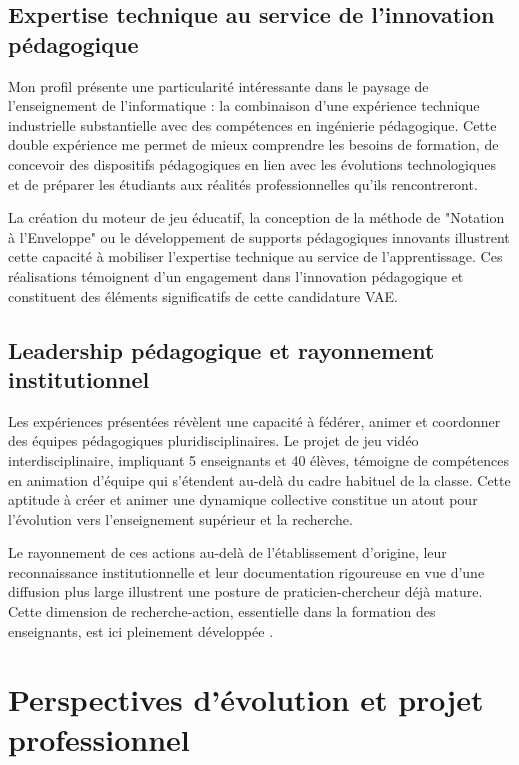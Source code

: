 \documentclass[12pt,a4paper]{report}
\begin{document}
\subsection*{Expertise technique au service de l'innovation pédagogique}

Mon profil présente une particularité intéressante dans le paysage de l'enseignement de l'informatique : la combinaison d'une expérience technique industrielle substantielle avec des compétences en ingénierie pédagogique. Cette double expérience me permet de mieux comprendre les besoins de formation, de concevoir des dispositifs pédagogiques en lien avec les évolutions technologiques et de préparer les étudiants aux réalités professionnelles qu'ils rencontreront.

La création du moteur de jeu éducatif, la conception de la méthode de "Notation à l'Enveloppe" ou le développement de supports pédagogiques innovants illustrent cette capacité à mobiliser l'expertise technique au service de l'apprentissage. Ces réalisations témoignent d'un engagement dans l'innovation pédagogique et constituent des éléments significatifs de cette candidature VAE.

\subsection*{Leadership pédagogique et rayonnement institutionnel}

Les expériences présentées révèlent une capacité à fédérer, animer et coordonner des équipes pédagogiques pluridisciplinaires. Le projet de jeu vidéo interdisciplinaire, impliquant 5 enseignants et 40 élèves, témoigne de compétences en animation d'équipe qui s'étendent au-delà du cadre habituel de la classe. Cette aptitude à créer et animer une dynamique collective constitue un atout pour l'évolution vers l'enseignement supérieur et la recherche.

Le rayonnement de ces actions au-delà de l'établissement d'origine, leur reconnaissance institutionnelle et leur documentation rigoureuse en vue d'une diffusion plus large illustrent une posture de praticien-chercheur déjà mature. Cette dimension de recherche-action, essentielle dans la formation des enseignants, est ici pleinement développée \parencite{recherche_action_education}.

\section*{Perspectives d'évolution et projet professionnel}
\end{document}
